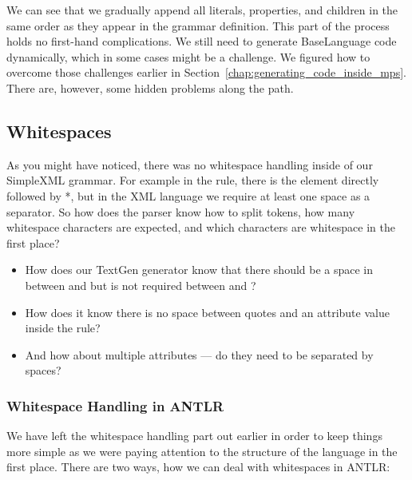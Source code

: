 We can see that we gradually append all literals, properties, and children in the same order as they appear in the grammar definition.
This part of the process holds no first-hand complications.
We still need to generate BaseLanguage code dynamically, which in some cases might be a challenge.
We figured how to overcome those challenges earlier in Section~\ref{chap:generating_code_inside_mps}.
There are, however, some hidden problems along the path.

\subsection{Whitespaces}
\label{chap:whitespaces}

As you might have noticed, there was no whitespace handling inside of our SimpleXML grammar.
For example in the  rule, there is  the element directly followed by *, but in the XML language we require at least one space as a separator.
So how does the parser know how to split tokens, how many whitespace characters are expected, and which characters are whitespace in the first place?

\begin{itemize}
	\item How does our TextGen generator know that there should be a space in between  and  but is not required between \literal{\textless} and ?

	\item How does it know there is no space between quotes and an attribute value inside the  rule?

	\item And how about multiple attributes --- do they need to be separated by spaces?
\end{itemize}

\subsubsection{Whitespace Handling in ANTLR}

We have left the whitespace handling part out earlier in order to keep things more simple as we were paying attention to the structure of the language in the first place.
There are two ways, how we can deal with whitespaces in ANTLR:

